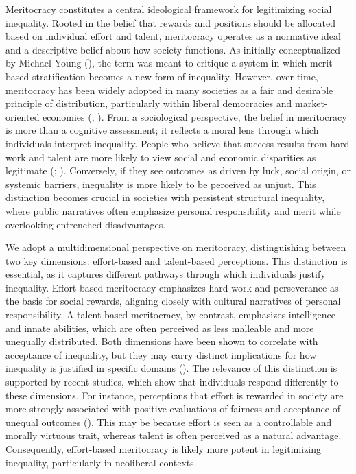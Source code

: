 \documentclass[
  12pt,
]{article}
\begin{document}
Meritocracy constitutes a central ideological framework for legitimizing
social inequality. Rooted in the belief that rewards and positions
should be allocated based on individual effort and talent, meritocracy
operates as a normative ideal and a descriptive belief about how society
functions. As initially conceptualized by Michael Young
(), the term was meant to critique a
system in which merit-based stratification becomes a new form of
inequality. However, over time, meritocracy has been widely adopted in
many societies as a fair and desirable principle of distribution,
particularly within liberal democracies and market-oriented economies
(;
). From a sociological
perspective, the belief in meritocracy is more than a cognitive
assessment; it reflects a moral lens through which individuals interpret
inequality. People who believe that success results from hard work and
talent are more likely to view social and economic disparities as
legitimate (;
).
Conversely, if they see outcomes as driven by luck, social origin, or
systemic barriers, inequality is more likely to be perceived as unjust.
This distinction becomes crucial in societies with persistent structural
inequality, where public narratives often emphasize personal
responsibility and merit while overlooking entrenched disadvantages.

We adopt a multidimensional perspective on meritocracy, distinguishing
between two key dimensions: effort-based and talent-based perceptions.
This distinction is essential, as it captures different pathways through
which individuals justify inequality. Effort-based meritocracy
emphasizes hard work and perseverance as the basis for social rewards,
aligning closely with cultural narratives of personal responsibility. A
talent-based meritocracy, by contrast, emphasizes intelligence and
innate abilities, which are often perceived as less malleable and more
unequally distributed. Both dimensions have been shown to correlate with
acceptance of inequality, but they may carry distinct implications for
how inequality is justified in specific domains
().
The relevance of this distinction is supported by recent studies, which
show that individuals respond differently to these dimensions. For
instance, perceptions that effort is rewarded in society are more
strongly associated with positive evaluations of fairness and acceptance
of unequal outcomes (). This may be because effort is seen as a controllable and morally
virtuous trait, whereas talent is often perceived as a natural
advantage. Consequently, effort-based meritocracy is likely more potent
in legitimizing inequality, particularly in neoliberal contexts.
\end{document}
